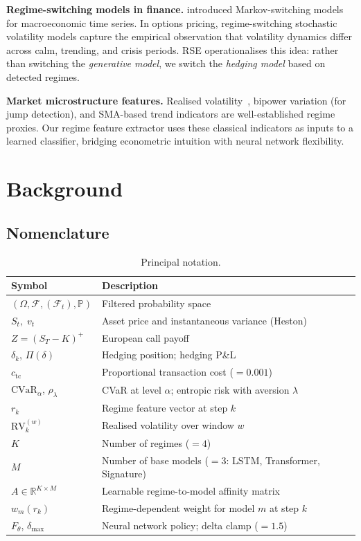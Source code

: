 \documentclass[11pt]{article}
\newcommand{\R}{\mathbb{R}}
\newcommand{\F}{\mathcal{F}}
\newcommand{\PP}{\mathbb{P}}
\newcommand{\cvar}{\mathrm{CVaR}}
\begin{document}
\textbf{Regime-switching models in finance.}
\citet{hamilton1989new} introduced Markov-switching models for macroeconomic time series. In options pricing, regime-switching stochastic volatility models capture the empirical observation that volatility dynamics differ across calm, trending, and crisis periods. RSE operationalises this idea: rather than switching the \emph{generative model}, we switch the \emph{hedging model} based on detected regimes.

\textbf{Market microstructure features.}
Realised volatility~\citep{barndorffnielsen2002econometric}, bipower variation (for jump detection), and SMA-based trend indicators are well-established regime proxies. Our regime feature extractor uses these classical indicators as inputs to a learned classifier, bridging econometric intuition with neural network flexibility.

\section{Background}
\label{sec:background}

\subsection{Nomenclature}

\begin{table}[h]
\centering
\caption{Principal notation.}
\label{tab:nomenclature}
\small
\begin{tabularx}{\textwidth}{@{}lX@{}}
\toprule
\textbf{Symbol} & \textbf{Description} \\
\midrule
$(\Omega,\F,(\F_t),\PP)$ & Filtered probability space \\
$S_t,\;v_t$ & Asset price and instantaneous variance (Heston) \\
$Z = (S_T-K)^+$ & European call payoff \\
$\delta_k$, $\Pi(\delta)$ & Hedging position; hedging P\&L \\
$c_{\mathrm{tc}}$ & Proportional transaction cost ($=0.001$) \\
$\cvar_\alpha$, $\rho_\lambda$ & CVaR at level $\alpha$; entropic risk with aversion $\lambda$ \\
$r_k$ & Regime feature vector at step $k$ \\
$\mathrm{RV}^{(w)}_k$ & Realised volatility over window $w$ \\
$K$ & Number of regimes ($=4$) \\
$M$ & Number of base models ($=3$: LSTM, Transformer, Signature) \\
$A \in \R^{K\times M}$ & Learnable regime-to-model affinity matrix \\
$w_m(r_k)$ & Regime-dependent weight for model $m$ at step $k$ \\
$F_\theta$, $\delta_{\max}$ & Neural network policy; delta clamp ($=1.5$) \\
\bottomrule
\end{tabularx}
\end{table}
\end{document}
